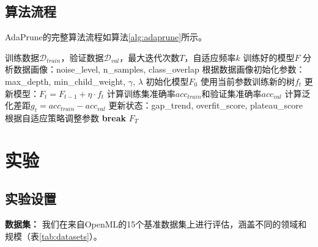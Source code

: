 \documentclass[12pt,a4paper]{article}
\begin{document}
\subsection{算法流程}

AdaPrune的完整算法流程如算法\ref{alg:adaprune}所示。

\begin{algorithm}[htbp]
\caption{AdaPrune算法}
\label{alg:adaprune}
\begin{algorithmic}[1]
\REQUIRE 训练数据$\mathcal{D}_{train}$，验证数据$\mathcal{D}_{val}$，最大迭代次数$T$，自适应频率$k$
\ENSURE 训练好的模型$F$
\STATE 分析数据画像：noise\_level, n\_samples, class\_overlap
\STATE 根据数据画像初始化参数：max\_depth, min\_child\_weight, $\gamma$, $\lambda$
\STATE 初始化模型$F_0$
    \STATE 使用当前参数训练新的树$f_t$
    \STATE 更新模型：$F_t = F_{t-1} + \eta \cdot f_t$
        \STATE 计算训练集准确率$acc_{train}$和验证集准确率$acc_{val}$
        \STATE 计算泛化差距$g_t = acc_{train} - acc_{val}$
        \STATE 更新状态：gap\_trend, overfit\_score, plateau\_score
        \STATE 根据自适应策略调整参数
    \ENDIF
        \STATE \textbf{break}
    \ENDIF
\ENDFOR
\RETURN $F_T$
\end{algorithmic}
\end{algorithm}

\section{实验}

\subsection{实验设置}

\textbf{数据集：} 我们在来自OpenML的15个基准数据集上进行评估，涵盖不同的领域和规模（表\ref{tab:datasets}）。
\end{document}
